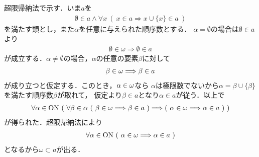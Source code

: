	\begin{prf}
		超限帰納法で示す．いま$a$を
		\begin{align}
			\emptyset \in a \wedge \forall x\ 
			(\ x \in a \Longrightarrow x \cup \{x\} \in a\ )
		\end{align}
		を満たす類とし，また$\alpha$を任意に与えられた順序数とする．
		$\alpha = \emptyset$の場合は$\emptyset \in a$より
		\begin{align}
			\emptyset \in \omega \Longrightarrow \emptyset \in a
		\end{align}
		が成立する．$\alpha \neq \emptyset$の場合，$\alpha$の任意の要素$\beta$に対して
		\begin{align}
			\beta \in {\bf \omega} \Longrightarrow \beta \in a
		\end{align}
		が成り立つと仮定する．このとき，$\alpha \in {\bf \omega}$なら
		$\alpha$は極限数でないから$\alpha = \beta \cup \{\beta\}$を満たす順序数$\beta$が取れて，
		仮定より$\beta \in a$となり$\alpha \in a$が従う．以上で
		\begin{align}
			\forall \alpha \in \ON\ (\ \forall \beta \in \alpha\ (\ \beta \in {\bf \omega} \Longrightarrow \beta \in a\ ) \Longrightarrow (\ \alpha \in {\bf \omega} \Longrightarrow \alpha \in a\ )\ )
		\end{align}
		が得られた．超限帰納法により
		\begin{align}
			\forall \alpha \in \mathrm{ON}\ (\ \alpha \in {\bf \omega} \Longrightarrow \alpha \in a\ )
		\end{align}
		となるから$\omega \subset a$が出る．
		\QED
	\end{prf}